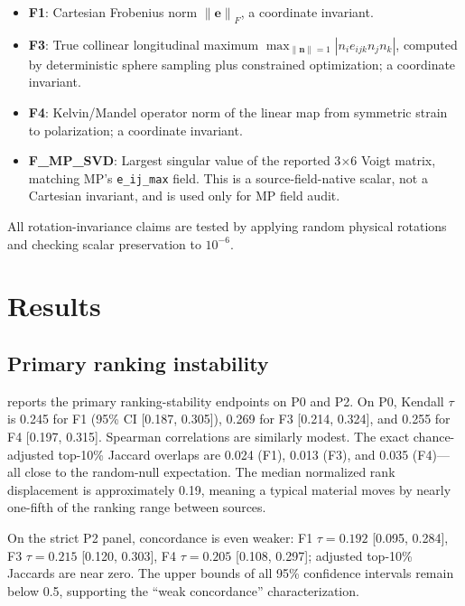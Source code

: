 \documentclass[11pt]{article}
\newcommand{\E}{\mathbf{e}}
\newcommand{\norm}[1]{\left\lVert #1 \right\rVert}
\begin{document}
\begin{itemize}[leftmargin=1.5em]
    \item \textbf{F1}: Cartesian Frobenius norm $\norm{\E}_F$, a coordinate invariant.
    \item \textbf{F3}: True collinear longitudinal maximum $\max_{\norm{\mathbf n}=1} |n_i e_{ijk} n_j n_k|$, computed by deterministic sphere sampling plus constrained optimization; a coordinate invariant.
    \item \textbf{F4}: Kelvin/Mandel operator norm of the linear map from symmetric strain to polarization; a coordinate invariant.
    \item \textbf{F\_MP\_SVD}: Largest singular value of the reported 3$\times$6 Voigt matrix, matching MP's \texttt{e\_ij\_max} field. This is a source-field-native scalar, not a Cartesian invariant, and is used only for MP field audit.
\end{itemize}

All rotation-invariance claims are tested by applying random physical rotations and checking scalar preservation to $10^{-6}$.

\section{Results}

\subsection{Primary ranking instability}

 reports the primary ranking-stability endpoints on P0 and P2. On P0, Kendall $\tau$ is 0.245 for F1 (95\% CI [0.187, 0.305]), 0.269 for F3 [0.214, 0.324], and 0.255 for F4 [0.197, 0.315]. Spearman correlations are similarly modest. The exact chance-adjusted top-10\% Jaccard overlaps are 0.024 (F1), 0.013 (F3), and 0.035 (F4)---all close to the random-null expectation. The median normalized rank displacement is approximately 0.19, meaning a typical material moves by nearly one-fifth of the ranking range between sources.

On the strict P2 panel, concordance is even weaker: F1 $\tau=0.192$ [0.095, 0.284], F3 $\tau=0.215$ [0.120, 0.303], F4 $\tau=0.205$ [0.108, 0.297]; adjusted top-10\% Jaccards are near zero. The upper bounds of all 95\% confidence intervals remain below 0.5, supporting the ``weak concordance'' characterization.


\end{document}
